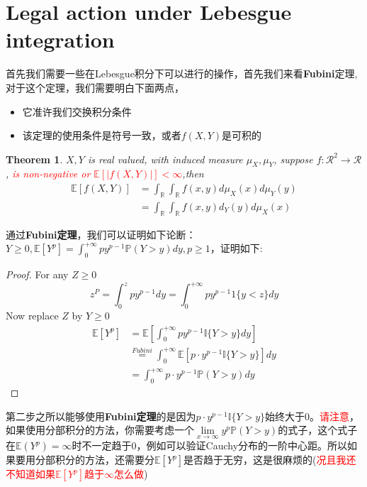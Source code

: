 \documentclass{article}
\newtheorem{theorem}{Theorem}[section]
\newtheorem*{proof}{Proof}
\begin{document}
\section{Legal action under Lebesgue integration}
	首先我们需要一些在Lebesgue积分下可以进行的操作，首先我们来看\textbf{Fubini}定理,对于这个定理，我们需要明白下面两点，
	\begin{itemize}
		\item 它准许我们交换积分条件
		\item 该定理的使用条件是符号一致，或者$f(X,Y)$是可积的
	\end{itemize}
	\begin{theorem}
		$X,Y$ is real valued, with induced measure $\mu_X,\mu_Y$, suppose $f:\mathcal{R}^2\to\mathcal{R}$, \textcolor{red}{is non-negative or $\mathbb{E}[|f(X, Y)|]<\infty$},then
		\begin{equation*}
			\begin{aligned}
				\mathbb{E}[f(X, Y)] & =\int_{\mathbb{R}} \int_{\mathbb{R}} f(x, y) d \mu_X(x) d \mu_Y(y) \\
				& =\int_{\mathbb{R}} \int_{\mathbb{R}} f(x, y) d _Y(y) d \mu_X(x)
			\end{aligned}
		\end{equation*}
	\end{theorem}
	通过\textbf{Fubini定理}，我们可以证明如下论断：$Y \geqslant 0, \mathbb{E} \left[Y^p\right]=\int_0^{+\infty} p y^{p-1} \mathbb{P}(Y>y) d y, p \geqslant 1$，证明如下:
	\begin{proof}
			For any \( Z \geqslant 0 \)
		\[
		z^P=\int_0^z p y^{p-1} d y=\int_0^{+\infty} p y^{p-1} 1\{y<z\} d y
		\]
		Now replace \( Z \) by \( Y \geqslant 0 \)
		\[
		\begin{aligned}
			\mathbb{E}\left[Y^p\right] & =\mathbb{E}\left[\int_0^{+\infty} p y^{p-1} \mathbb{I}\{Y>y\} d y\right] \\
			& \overset{Fubini}{=}\int_0^{+\infty} \mathbb{E}\left[p \cdot y^{p-1} \mathbb{I}\{Y>y\}\right] d y \\
			& =\int_0^{+\infty} p \cdot y^{p-1} \mathbb{P}(Y>y) d y
		\end{aligned}
		\]
	\end{proof}
	第二步之所以能够使用\textbf{Fubini定理}的是因为$p \cdot y^{p-1} \mathbb{I}\{Y>y\}$始终大于0。\textcolor{red}{请注意}，如果使用分部积分的方法，你需要考虑一个$\underset{x\to\infty}{\lim}y^p\mathbb{P}(Y>y)$的式子，这个式子在$\mathbb{E}(Y^p)=\infty$时不一定趋于0，例如可以验证Cauchy分布的一阶中心距。所以如果要用分部积分的方法，还需要分$\mathbb{E}\left[Y^p\right]$是否趋于无穷，这是很麻烦的(\textcolor{red}{况且我还不知道如果$\mathbb{E}\left[Y^p\right]$趋于$\infty$怎么做})
\end{document}
